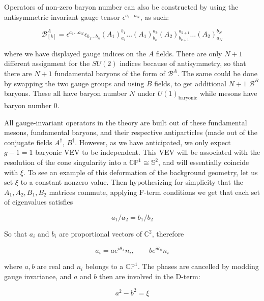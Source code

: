Operators of non-zero baryon number can also be constructed by using the antisymmetric invariant gauge tensor $\epsilon^{a_1\ldots a_N}$, as such:

\begin{equation}
	\mathcal{B}^A_{[k]} = \epsilon^{a_1\ldots a_N} \epsilon_{b_1\ldots b_n} (A_1)_{a_1}^{b_1} \ldots (A_1)^{a_k}_{b_k} (A_2)^{a_{k+1}}_{b_{k+1}} \ldots (A_2)^{b_N}_{a_N}
	\label{}
\end{equation}

where we have displayed gauge indices on the $A$ fields. There are only $N+1$ different assignment for the $SU(2)$ indices because of antisymmetry, so that there are $N+1$ fundamental baryons of the form of $\mathcal{B}^A$. The same could be done by swapping the two gauge groups and using $B$ fields, to get additional $N+1$ $\mathcal{B}^B$ baryons. These all have baryon number $N$ under $U(1)_\text{baryonic}$ while mesons have baryon number $0$.

All gauge-invariant operators in the theory are built out of these fundamental mesons, fundamental baryons, and their respective antiparticles (made out of the conjugate fields $A^\dagger$, $B^\dagger$. However, as we have anticipated, we only expect $g-1 = 1$ baryonic VEV to be independent. This VEV will be associated with the resolution of the cone singularity into a $\mathbb{CP}^1 \cong \mathbb{S}^2$, and will essentially coincide with $\xi$. To see an example of this deformation of the background geometry, let us set $\xi$ to a constant nonzero value. Then hypothesizing for simplicity that the $A_1, A_2, B_1, B_2$ matrices commute, applying F-term conditions we get that each set of eigenvalues satisfies

\begin{equation}
	a_1/a_2 = b_1/b_2
	\label{}
\end{equation}

So that $a_i$ and $b_i$ are proportional vectors of $\mathbb{C}^2$, therefore

\begin{equation}
	a_i = a e^{i\theta_A} n_i, \quad \quad b e^{i\theta_B} n_i
	\label{}
\end{equation}

where $a,b$ are real and $n_i$ belongs to a $\mathbb{CP}^1$. The phases are cancelled by modding gauge invariance, and $a$ and $b$ then are involved in the D-term:

\begin{equation}
	a^2 - b^2 = \xi
	\label{}
\end{equation}

